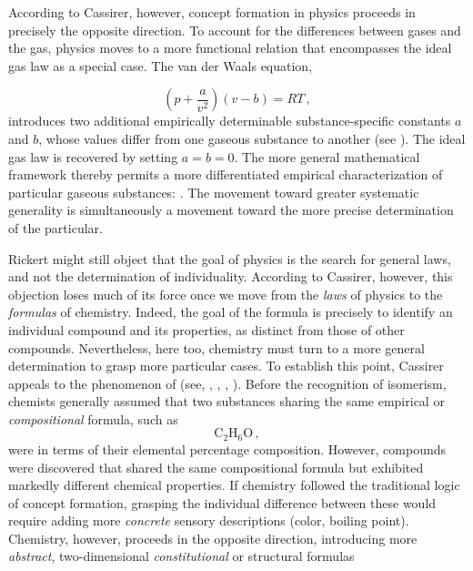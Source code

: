\documentclass[submitted,12pt]{article}
\begin{document}
According to Cassirer, however, concept formation in physics proceeds in precisely the opposite direction. To account for the differences between  gases and the  gas, physics moves to a more  functional relation that encompasses the ideal gas law as a special case. The van der Waals equation, 

\begin{equation*}
\left(p+\frac{a}{v^2}\right)(v-b)=RT\,,
\end{equation*}
%
introduces two additional empirically determinable substance-specific constants $a$ and $b$, whose values differ from one gaseous substance to another (see ). The ideal gas law is recovered by setting $a=b=0$. The more general mathematical framework thereby permits a more differentiated empirical characterization of particular gaseous substances:  . The movement toward greater systematic generality is simultaneously a movement toward the more precise determination of the particular.

Rickert might still object that the goal of physics is the search for general laws, and not the determination of individuality. According to Cassirer, however, this objection loses much of its force once we move from the \emph{laws} of physics to the \emph{formulas} of chemistry. Indeed, the goal of the formula is precisely to identify an individual compound and its properties, as distinct from those of other compounds. Nevertheless, here too, chemistry must turn to a more general determination to grasp more particular cases. To establish this point, Cassirer appeals to the phenomenon of  (see, \cite[122--24, 274--78]{Ladenburg1902}, \cite[chap.~VII]{Duhem1902}, \cite[II.III]{Wurtz1879}, \cite[lect.~IV]{Ostwald1906Leitlinien}). Before the recognition of isomerism, chemists generally assumed that two substances sharing the same empirical or \emph{compositional} formula, such as
%
\begin{equation*}
\mathrm{C}_2 \mathrm{H}_6 \mathrm{O}\,,
\end{equation*}
%
were  in terms of their elemental percentage composition. However, compounds were discovered that shared the same compositional formula but exhibited markedly different chemical properties. If chemistry followed the traditional logic of concept formation, grasping the individual difference between these  would require adding more \emph{concrete} sensory descriptions (color, boiling point\etc). Chemistry, however, proceeds in the opposite direction, introducing more \emph{abstract}, two-dimensional \emph{constitutional} or structural formulas 
\end{document}
